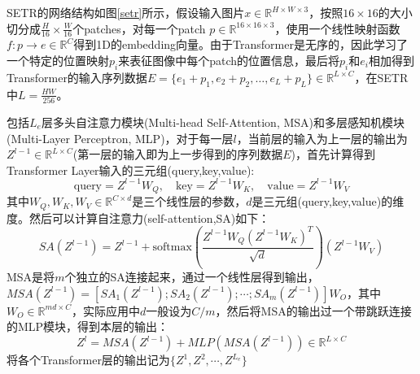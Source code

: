 \documentclass[cn,12pt,color=mine,scheme=chinese,bibstyle=gb7714-2015]{elegantbook}
\begin{document}
\begin{note}[图像转换为序列数据输入]
	SETR的网络结构如图\ref{setr}所示，假设输入图片$x\in\mathbb{R}^{H\times W\times 3}$，按照$16\times16$的大小切分成$\frac{H}{16}\times\frac{W}{16}$个patches，对每一个patch $p\in\mathbb{R}^{16\times16\times3}$，使用一个线性映射函数$f:p\rightarrow e\in\mathbb{R}^C$得到1D的embedding向量。由于Transformer是无序的，因此学习了一个特定的位置映射$p_i$来表征图像中每个patch的位置信息，最后将$p_i$和$e_i$相加得到Transformer的输入序列数据$E=\{e_1+p_1,e_2+p_2,\dots,e_L+p_L\}\in \mathbb{R}^{L\times C}$，在SETR中$L=\frac{HW}{256}$。
\end{note}

\begin{note}[Transformer编码器]
	包括$L_e$层多头自注意力模块(Multi-head Self-Attention, MSA)和多层感知机模块(Multi-Layer Perceptron, MLP)，对于每一层$l$，当前层的输入为上一层的输出为$Z^{l-1}\in \mathbb{R}^{L\times C}$(第一层的输入即为上一步得到的序列数据$E$)，首先计算得到Transformer Layer输入的三元组(query,key,value):
	\begin{equation}
		\text{query}=Z^{l-1}W_Q,\quad \text{key}=Z^{l-1}W_K,\quad \text{value}=Z^{l-1}W_V
	\end{equation}
	其中$W_Q,W_K,W_V\in\mathbb{R}^{C\times d}$是三个线性层的参数，$d$是三元组(query,key,value)的维度。然后可以计算自注意力(self-attention,SA)如下：
	\begin{equation}
		SA(Z^{l-1})=Z^{l-1}+\text{softmax}(\frac{Z^{l-1}W_Q(Z^{l-1}W_K)^T}{\sqrt{d}})(Z^{l-1}W_V)
	\end{equation}
	MSA是将$m$个独立的SA连接起来，通过一个线性层得到输出，$MSA(Z^{l-1})=[SA_1(Z^{l-1});SA_2(Z^{l-1});\cdots;SA_m(Z^{l-1})]W_O$，其中$W_O\in\mathbb{R}^{md\times C}$，实际应用中$d$一般设为$C/m$，然后将MSA的输出过一个带跳跃连接的MLP模块，得到本层的输出：
	\begin{equation}
		Z^l=MSA(Z^{l-1})+MLP(MSA(Z^{l-1}))\in\mathbb{R}^{L\times C}
	\end{equation}
	将各个Transformer层的输出记为$\{Z^1,Z^2,\cdots,Z^{L_e}\}$
\end{note}
\end{document}
